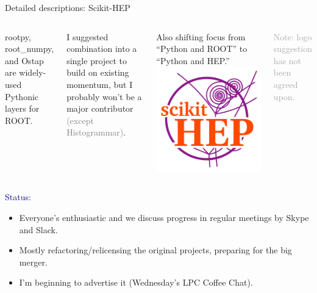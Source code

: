 \documentclass{beamer}
\begin{document}
\begin{frame}{Detailed descriptions: Scikit-HEP}
\vspace{0.5 cm}
\begin{columns}
rootpy, root\_numpy, and Ostap are widely-used Pythonic layers for ROOT.

\vspace{0.2 cm}
I suggested combination into a single project to build on existing momentum, but I probably won't be a major contributor \textcolor{gray}{(except Histogrammar)}.

\vspace{0.2 cm}
Also shifting focus from ``Python and ROOT'' to ``Python and HEP.''
\scriptsize
\includegraphics[width=\linewidth]{femtocode-logo.png}

\textcolor{darkgray}{Note: logo suggestion has not been agreed upon.}
\end{columns}

\vspace{0.4 cm}
\textcolor{darkblue}{Status:}
\begin{itemize}
\item Everyone's enthusiastic and we discuss progress in regular meetings by Skype and Slack.
\item Mostly refactoring/relicensing the original projects, preparing for the big merger.
\item I'm beginning to advertise it (Wednesday's LPC Coffee Chat).
\end{itemize}
\end{frame}
\end{document}
